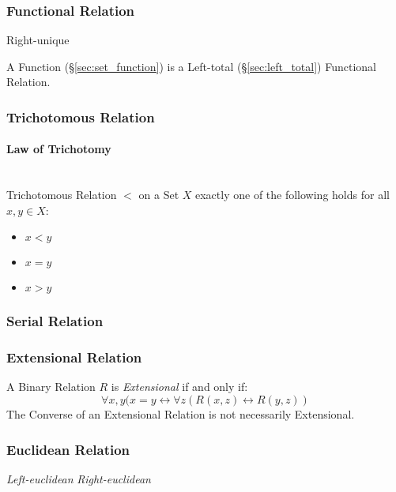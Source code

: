 \subsubsection{Functional Relation}\label{sec:functional_relation}

Right-unique

A Function (\S\ref{sec:set_function}) is a Left-total
(\S\ref{sec:left_total}) Functional Relation.



\subsubsection{Trichotomous Relation}\label{sec:trichotomous_relation}

\paragraph{Law of Trichotomy}\label{sec:trichotomy_law}
\hfill \\

Trichotomous Relation $<$ on a Set $X$ exactly one of the following
holds for all $x,y \in X$:
\begin{itemize}
\item $x < y$
\item $x = y$
\item $x > y$
\end{itemize}



\subsubsection{Serial Relation}\label{sec:serial_relation}

\subsubsection{Extensional Relation}\label{sec:extensional_relation}

A Binary Relation $R$ is \emph{Extensional} if and only if:
\[
  \forall x,y (x = y \leftrightarrow
    \forall z (R(x,z) \leftrightarrow R(y,z))
\]
The Converse of an Extensional Relation is not necessarily
Extensional.

\subsubsection{Euclidean Relation}\label{sec:euclidean_relation}

\emph{Left-euclidean} \emph{Right-euclidean}



